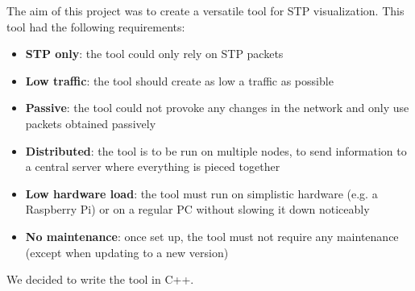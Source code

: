The aim of this project was to create a versatile tool for STP visualization.
This tool had the following requirements:
\begin{itemize}
    \item \textbf{STP only}: the tool could only rely on STP packets
    \item \textbf{Low traffic}: the tool should create as low a traffic as possible
    \item \textbf{Passive}: the tool could not provoke any changes in the network and only use packets obtained passively
    \item \textbf{Distributed}: the tool is to be run on multiple nodes, to send information to a central server where everything is pieced together
    \item \textbf{Low hardware load}: the tool must run on simplistic hardware (e.g. a Raspberry Pi) or on a regular PC without slowing it down noticeably
    \item \textbf{No maintenance}: once set up, the tool must not require any maintenance (except when updating to a new version)
\end{itemize}

We decided to write the tool in C++.
